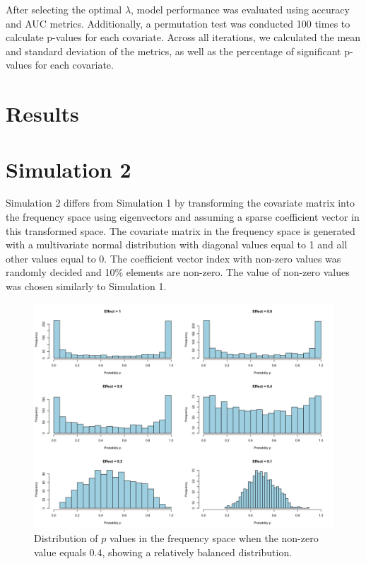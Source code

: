 \documentclass[12pt]{article}
\begin{document}
After selecting the optimal \( \lambda \), model performance was evaluated using accuracy and AUC metrics. Additionally, a permutation test was conducted 100 times to calculate p-values for each covariate. Across all iterations, we calculated the mean and standard deviation of the metrics, as well as the percentage of significant p-values for each covariate.

\section*{Results}

\section*{Simulation 2}

Simulation 2 differs from Simulation 1 by transforming the covariate matrix into the frequency space using eigenvectors and assuming a sparse coefficient vector in this transformed space. The covariate matrix in the frequency space is generated with a multivariate normal distribution with diagonal values equal to 1 and all other values equal to 0. The coefficient vector index with non-zero values was randomly decided and 10\% elements are non-zero. The value of non-zero values was chosen similarly to Simulation 1.


\begin{figure}[H]
    \centering
    \includegraphics[width=\textwidth]{../Figures/sim2_p_dist.png}
    \caption{Distribution of \(p\) values in the frequency space when the non-zero value equals 0.4, showing a relatively balanced distribution.}
    \label{fig:sim2_p_dist}
\end{figure}
\end{document}
